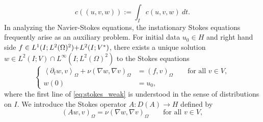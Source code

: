 \documentclass{m2an}
\newcommand\blue[1]{\textcolor{black}{#1}}
\newtheorem{remark}[theorem]{Remark}
\newcommand{\R}{\mathbb{R}}
\newcommand{\Oprod}[1]{\left( #1 \right)_{\Omega}}
\newcommand{\Opair}[1]{\left\langle #1 \right\rangle_{\Omega}}
\newcommand{\chatO}[1]{\hat c\left( #1 \right)}
\newcommand{\chatIO}[1]{\hat c \left(\!\left( #1 \right)\!\right)}
\newcommand{\cO}[1]{c\left( #1 \right)}
\newcommand{\cIO}[1]{c \left(\!\left( #1 \right)\!\right)}
\newcommand{\Hozs}{H^1_0(\Omega)^2}
\begin{document}
\begin{equation*}
    \cIO{u,v,w} := \int_I \cO{u,v,w} \ dt.
\end{equation*}
In analyzing the Navier-Stokes equations, 
the instationary Stokes equations frequently arise as an auxiliary problem.
For initial data $u_0 \in H$ and right hand side $f\in L^1(I;L^2(\Omega)^2)\blue{+L^2(I;V^*)}$,
there exists a unique solution $w \in L^2(I;V) \cap L^\infty(I;L^2(\Omega)^2)$ to the Stokes equations
\begin{equation}\label{eq:stokes_weak}
  \left\lbrace
  \begin{aligned}
    \Opair{\partial_t w,v} + \nu \Oprod{\nabla w, \nabla v} &= \Oprod{f,v}
  \qquad \text{for all } v \in V,\\
  w(0) &= u_0,
  \end{aligned}
  \right.
\end{equation}
where the first line of \eqref{eq:stokes_weak} is understood in the sense of distributions on $I$.
We introduce the Stokes operator $A\colon D(A) \to H$ defined by 
\begin{equation*}
  \Oprod{A w,v} = \nu \Oprod{\nabla w,\nabla v} \qquad \text{for all } v \in V,
\end{equation*}
\end{document}
